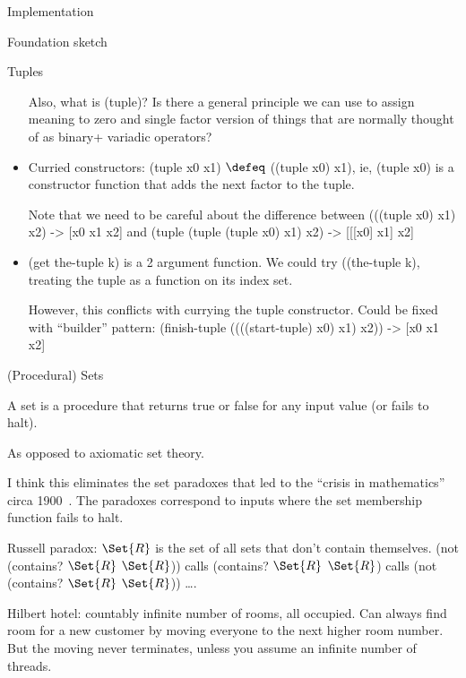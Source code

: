 \documentclass[12pt]{PalisadesLakesBook}
\begin{document}
\begin{plSection}{Implementation}
\begin{plSection}{Foundation sketch}
\begin{plSection}{Tuples}
\begin{itemize}
  Also, what is {\pseudocodeFont (tuple)}?
  Is there a general principle we can use to assign meaning
  to zero and single factor version of things that are normally 
  thought of as binary+ variadic operators?
  
  \item Curried constructors: 
  {\pseudocodeFont (tuple x0 x1)} 
  $\defeq$ 
  {\pseudocodeFont ((tuple x0) x1)},
  ie, {\pseudocodeFont (tuple x0)} is a constructor function
  that adds the next factor to the tuple.
  
  Note that we need to be careful about the difference between
  {\pseudocodeFont (((tuple x0) x1) x2) -> [x0 x1 x2]}
  and 
  {\pseudocodeFont (tuple (tuple (tuple x0) x1) x2) 
  -> [[[x0] x1] x2]}
  
  \item {\pseudocodeFont (get the-tuple k)}
   is a 2 argument function.
  We could try {\pseudocodeFont ((the-tuple k)}, treating the
  tuple as a function on its index set.
  
  However, this conflicts with currying the tuple constructor.
  Could be fixed with ``builder'' pattern:
  {\pseudocodeFont (finish-tuple ((((start-tuple) x0) x1) x2)) 
  -> [x0 x1 x2]}
  
\end{itemize}

\end{plSection}%
\begin{plSection}{(Procedural) Sets} 

A set is a procedure that returns true or false for any input
value (or fails to halt).

As opposed to axiomatic set theory.

I think this eliminates the set paradoxes
that led to the ``crisis in mathematics'' circa 1900~\cite{
Feferman:2000:ConstructivePredicativeClassicalAnalysis,
Ferreiros:2008:Crisis}.
The paradoxes correspond to inputs where the set membership
function fails to halt.

Russell paradox: 
$\Set{R}$ is the set of all sets that don't contain themselves.
{\pseudocodeFont (not (contains? $\Set{R}$ $\Set{R}$))}
calls 
{\pseudocodeFont (contains? $\Set{R}$ $\Set{R}$)}
calls
{\pseudocodeFont (not (contains? $\Set{R}$ $\Set{R}$))}
{\ldots}.

Hilbert hotel: countably infinite number of rooms, all occupied.
Can always find room for a new customer by moving everyone
to the next higher room number.
But the moving never terminates, 
unless you assume an infinite number of threads.


\end{plSection}
\end{plSection}
\end{plSection}
\end{document}
